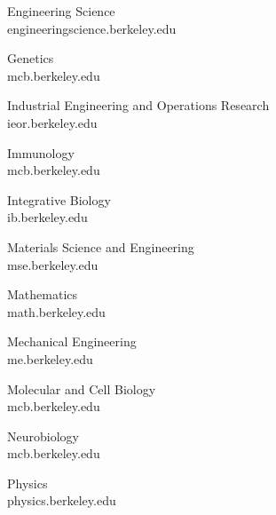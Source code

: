 Engineering Science \\
{\selectfont engineeringscience.berkeley.edu}

Genetics \\
{\selectfont mcb.berkeley.edu}

Industrial Engineering and Operations Research \\
{\selectfont ieor.berkeley.edu}

Immunology \\
{\selectfont mcb.berkeley.edu}

Integrative Biology \\
{\selectfont ib.berkeley.edu}

Materials Science and Engineering \\
{\selectfont mse.berkeley.edu}

Mathematics \\
{\selectfont math.berkeley.edu}

Mechanical Engineering \\
{\selectfont me.berkeley.edu}

Molecular and Cell Biology \\
{\selectfont mcb.berkeley.edu}

Neurobiology \\
{\selectfont mcb.berkeley.edu}

Physics \\
{\selectfont physics.berkeley.edu}

